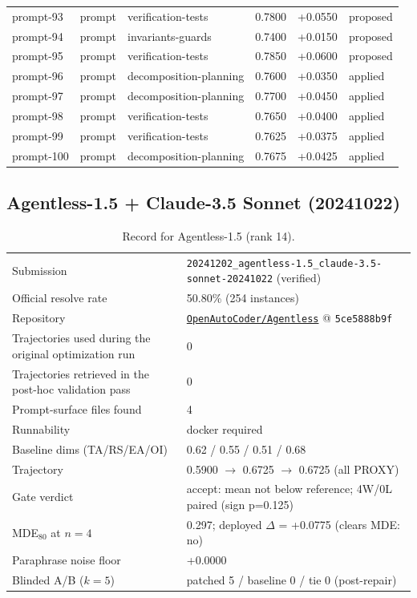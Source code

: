 \begin{center}
\begin{longtable}{llp{5.2cm}rrl}
prompt-93 & prompt & verification-tests & 0.7800 & +0.0550 & proposed \\
prompt-94 & prompt & invariants-guards & 0.7400 & +0.0150 & proposed \\
prompt-95 & prompt & verification-tests & 0.7850 & +0.0600 & proposed \\
prompt-96 & prompt & decomposition-planning & 0.7600 & +0.0350 & applied \\
prompt-97 & prompt & decomposition-planning & 0.7700 & +0.0450 & applied \\
prompt-98 & prompt & verification-tests & 0.7650 & +0.0400 & applied \\
prompt-99 & prompt & verification-tests & 0.7625 & +0.0375 & applied \\
prompt-100 & prompt & decomposition-planning & 0.7675 & +0.0425 & applied \\
\bottomrule\end{longtable}\end{center}
\clearpage
\subsection{Agentless-1.5 + Claude-3.5 Sonnet (20241022)}
\label{app:agent14}
\begin{table}[h]\centering\scriptsize
\caption{Record for Agentless-1.5 (rank 14).}
\begin{tabular}{lp{8.2cm}}\toprule
Submission & \texttt{20241202\_\allowbreak{}agentless-1.5\_\allowbreak{}claude-3.5-sonnet-20241022} (verified) \\
Official resolve rate & 50.80\% (254 instances) \\
Repository & \href{https://github.com/OpenAutoCoder/Agentless}{\texttt{OpenAutoCoder/Agentless}} @ \texttt{5ce5888b9f} \\
Trajectories used during the original optimization run & 0 \\
Trajectories retrieved in the post-hoc validation pass & 0 \\
Prompt-surface files found & 4 \\
Runnability & docker required \\
Baseline dims (TA/RS/EA/OI) & 0.62 / 0.55 / 0.51 / 0.68 \\
Trajectory & 0.5900 $\to$ 0.6725 $\to$ 0.6725 (all PROXY) \\
Gate verdict & accept: mean not below reference; 4W/0L paired (sign p=0.125) \\
MDE$_{80}$ at $n{=}4$ & 0.297; deployed $\Delta$ = +0.0775 (clears MDE: no) \\
Paraphrase noise floor & +0.0000 \\
Blinded A/B ($k{=}5$) & patched 5 / baseline 0 / tie 0 (post-repair) \\
\bottomrule\end{tabular}\end{table}
